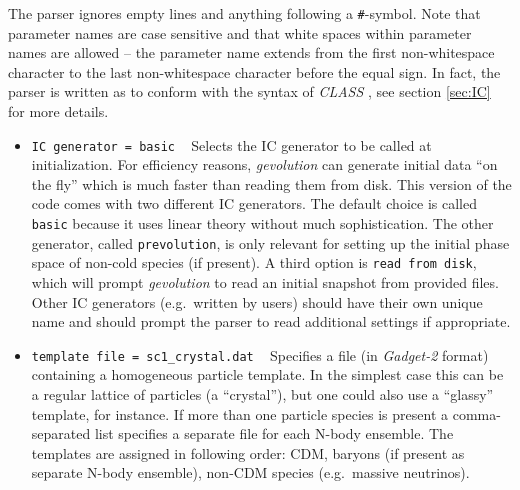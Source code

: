 \documentclass[a4paper,10pt]{article}
\begin{document}
\noindent The parser ignores empty lines and anything following a \texttt{\#}-symbol. Note that parameter names are case sensitive and that 
white spaces within parameter names are allowed -- the parameter name extends from the first non-whitespace character to the last
non-whitespace character before the equal sign. In fact, the parser is written as to conform with the syntax of \textit{CLASS}
\cite{Blas:2011rf}, see section \ref{sec:IC} for more details.

\begin{itemize}
 \item[] \hspace{-25pt}\texttt{IC generator = basic} ~ Selects the IC generator to be called at initialization. For efficiency reasons,
 \textit{gevolution} can generate initial data ``on the fly'' which is much faster than reading them from disk. This version of the code
 comes with two different IC generators. The default choice is called \texttt{basic} because it uses linear theory without much
 sophistication. The other generator, called \texttt{prevolution}, is only relevant for setting up the initial phase space of non-cold
 species (if present). A third option is \texttt{read~from~disk}, which will prompt \textit{gevolution} to read an initial snapshot from
 provided files. Other IC generators (e.g.\ written by users) should have their own unique name and should prompt the parser to read
 additional settings if appropriate.
 \item[] \hspace{-25pt}\texttt{template file = sc1\_crystal.dat} ~ Specifies a file (in \textit{Gadget-2} format) containing a homogeneous
 particle template. In the simplest case this can be a regular lattice of particles (a ``crystal''), but one could also use a ``glassy''
 template, for instance. If more than one particle species is present a comma-separated list specifies a separate file for each N-body
 ensemble. The templates are assigned in following order: CDM, baryons (if present as separate N-body ensemble), non-CDM species (e.g.\
 massive neutrinos).
 

\end{itemize}
\end{document}
